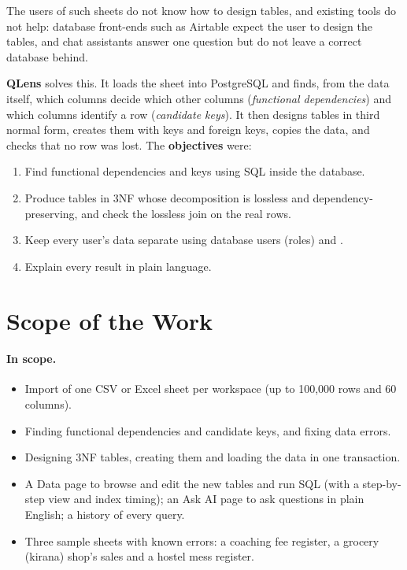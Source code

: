 The users of such sheets do not know how to design tables, and existing tools do not help: database
front-ends such as Airtable expect the user to design the tables, and chat assistants answer one question
but do not leave a correct database behind.

\textbf{QLens} solves this. It loads the sheet into PostgreSQL and finds, from the data itself, which
columns decide which other columns (\emph{functional dependencies}) and which columns identify a row
(\emph{candidate keys}). It then designs tables in third normal form, creates them with keys and
foreign keys, copies the data, and checks that no row was lost. The \textbf{objectives} were:

\begin{enumerate}[label=O\arabic*.]
  \item Find functional dependencies and keys using SQL inside the database.
  \item Produce tables in 3NF whose decomposition is lossless and dependency-preserving, and check the
  lossless join on the real rows.
  \item Keep every user's data separate using database users (roles) and .
  \item Explain every result in plain language.
\end{enumerate}

\section{Scope of the Work}
\label{sec:scope}

\paragraph{In scope.}
\begin{itemize}
  \item Import of one CSV or Excel sheet per workspace (up to 100{,}000 rows and 60 columns).
  \item Finding functional dependencies and candidate keys, and fixing data errors.
  \item Designing 3NF tables, creating them and loading the data in one transaction.
  \item A Data page to browse and edit the new tables and run SQL (with a step-by-step view and index
  timing); an Ask AI page to ask questions in plain English; a history of every query.
  \item Three sample sheets with known errors: a coaching fee register, a grocery (kirana) shop's sales
  and a hostel mess register.
\end{itemize}

